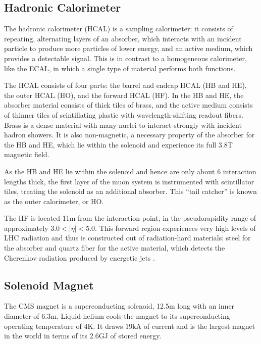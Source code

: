 \subsection{Hadronic Calorimeter}
The hadronic calorimeter (HCAL) is a sampling calorimeter: it consists of repeating, alternating layers of an absorber, which interacts with an incident particle to produce more particles of lower energy, and an active medium, which provides a detectable signal.
This is in contrast to a homogeneous calorimeter, like the ECAL, in which a single type of material performs both functions.

The HCAL consists of four parts: the barrel and endcap HCAL (HB and HE), the outer HCAL (HO), and the forward HCAL (HF).
In the HB and HE, the absorber material consists of thick tiles of brass, and the active medium consists of thinner tiles of scintillating plastic with wavelength-shifting readout fibers.
Brass is a dense material with many nuclei to interact strongly with incident hadron showers.
It is also non-magnetic, a necessary property of the absorber for the HB and HE, which lie within the solenoid and experience its full 3.8\unit{T} magnetic field.

As the HB and HE lie within the solenoid and hence are only about 6 interaction lengths thick, the first layer of the muon system is instrumented with scintillator tiles, treating the solenoid as an additional absorber.
This ``tail catcher'' is known as the outer calorimeter, or HO.

The HF is located 11\unit{m} from the interaction point, in the pseudorapidity range of approximately $3.0 < |\eta| < 5.0$.
This forward region experiences very high levels of LHC radiation and thus is constructed out of radiation-hard materials: steel for the absorber and quartz fiber for the active material, which detects the Cherenkov radiation produced by energetic jets \cite{Chatrchyan:2008zzk, CERN-LHCC-97-031, Penzo2009}.

\subsection{Solenoid Magnet}
The CMS magnet is a superconducting solenoid, 12.5\unit{m} long with an inner diameter of 6.3\unit{m}. Liquid helium cools the magnet to its superconducting operating temperature of 4\unit{K}. It draws 19\unit{kA} of current and is the largest magnet in the world in terms of its 2.6\unit{GJ} of stored energy.

